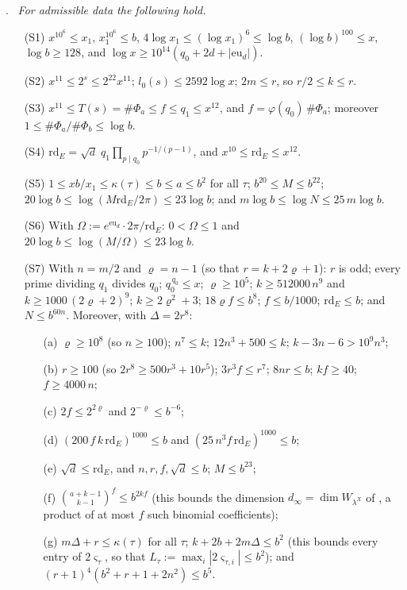 \documentclass[10pt]{amsart}
\theoremstyle{definition}
\theoremstyle{remark}
\providecommand{\anPa}{\Phi_a}
\providecommand{\anPb}{\Phi_b}
\providecommand{\aneu}{\mathrm{eu}_d}
\providecommand{\anrd}{\mathrm{rd}}
\newenvironment{quotedthm}[2]{\par\medskip\noindent\begingroup
  \textbf{#1}#2.\ \itshape\ignorespaces}{\endgroup\par\medskip}
\begin{document}
\begin{quotedthm}{\cite[Lemma~13.4]{P46}}{}
For admissible data the following hold.
\begin{enumerate}
\item[(S1)] $x^{10^{6}}\le x_1$, $x_1^{10^{6}}\le b$,
$4\log x_1\le(\log x_1)^{6}\le\log b$,
$(\log b)^{100}\le x$, $\log b\ge128$, and
$\log x\ge10^{14}(q_0+2d+|\aneu|)$.
\item[(S2)] $x^{11}\le2^{s}\le2^{22}x^{11}$; $l_0(s)\le2592\log x$;
$2m\le r$, so $r/2\le k\le r$.
\item[(S3)] $x^{11}\le T(s)=\#\anPa\le f\le q_1\le x^{12}$, and
$f=\varphi(q_0)\,\#\anPa$; moreover $1\le\#\anPa/\#\anPb\le\log b$.
\item[(S4)] $\anrd_E=\sqrt d\;q_1\prod_{p\mid q_0}p^{-1/(p-1)}$, and
$x^{10}\le\anrd_E\le x^{12}$.
\item[(S5)] $1\le xb/x_1\le\kappa(\tau)\le b\le a\le b^{2}$ for all $\tau$;
$b^{20}\le M\le b^{22}$;
$20\log b\le\log(M\anrd_E/2\pi)\le23\log b$; and
$m\log b\le\log N\le25\,m\log b$.
\item[(S6)] With $\Omega:=e^{\aneu}\cdot2\pi/\anrd_E$: $0<\Omega\le1$ and
$20\log b\le\log(M/\Omega)\le23\log b$.
\item[(S7)] With $n=m/2$ and $\varrho=n-1$ (so that $r=k+2\varrho+1$): $r$ is odd; every prime
dividing $q_1$ divides $q_0$; $q_0^{\,q_0}\le x$; $\varrho\ge10^{5}$;
$k\ge512000\,n^{9}$ and $k\ge1000\,(2\varrho+2)^{9}$; $k\ge2\varrho^{2}+3$; $18\varrho f\le b^{8}$;
$f\le b/1000$; $\anrd_E\le b$; and $N\le b^{60n}$. Moreover, with $\Delta=2r^{8}$:
\begin{itemize}
\item[(a)] $\varrho\ge10^{8}$ (so $n\ge100$); $n^{7}\le k$; $12n^{3}+500\le k$; $k-3n-6>10^{9}n^{3}$;
\item[(b)] $r\ge100$ (so $2r^{8}\ge500r^{3}+10r^{5}$); $3r^{3}f\le r^{7}$; $8nr\le b$; $kf\ge40$; $f\ge4000\,n$;
\item[(c)] $2f\le2^{2\varrho}$ and $2^{-\varrho}\le b^{-6}$;
\item[(d)] $(200\,f\,k\,\anrd_E)^{1000}\le b$ and $(25\,n^{3}f\,\anrd_E)^{1000}\le b$;
\item[(e)] $\sqrt d\le\anrd_E$, and $n,r,f,\sqrt d\le b$; $M\le b^{23}$;
\item[(f)] $\binom{a+k-1}{k-1}^{f}\le b^{2kf}$ (this bounds the dimension $d_\infty=\dim W_{\lambda^X}$ of
{\cite[\S14.3]{P46}}, a product of at most $f$ such binomial coefficients);
\item[(g)] $m\Delta+r\le\kappa(\tau)$ for all $\tau$; $k+2b+2m\Delta\le b^{2}$ (this bounds every
entry of $2\varsigma_\tau$, so that $L_\tau:=\max_i|2\varsigma_{\tau,i}|\le b^{2}$); and
$(r+1)^{4}(b^{2}+r+1+2n^{2})\le b^{5}$.
\end{itemize}
\end{enumerate}
\end{quotedthm}
\end{document}
